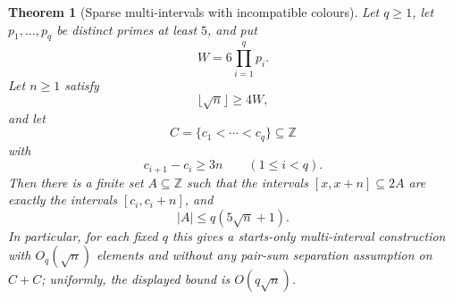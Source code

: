 \documentclass[11pt]{article}
\newtheorem{theorem}{Theorem}
\newcommand{\Z}{\mathbb{Z}}
\begin{document}
\begin{theorem}[Sparse multi-intervals with incompatible colours]
\label{thm:sparse-crt}
Let $q\geq1$, let $p_1,\ldots,p_q$ be distinct primes at least $5$, and put
\[
 W=6\prod_{i=1}^q p_i.
\]
Let $n\geq1$ satisfy
\[
 \lfloor\sqrt n\rfloor\geq 4W,
\]
and let
\[
 C=\{c_1<\cdots<c_q\}\subseteq\Z
\]
with
\[
 c_{i+1}-c_i\geq 3n
 \qquad (1\leq i<q).
\]
Then there is a finite set $A\subseteq\Z$ such that the intervals
$[x,x+n]\subseteq 2A$ are exactly the intervals $[c_i,c_i+n]$, and
\[
 |A|\leq q(5\sqrt n+1).
\]
In particular, for each fixed $q$ this gives a starts-only multi-interval
construction with $O_q(\sqrt n)$ elements and without any pair-sum separation
assumption on $C+C$; uniformly, the displayed bound is $O(q\sqrt n)$.
\end{theorem}
\end{document}
